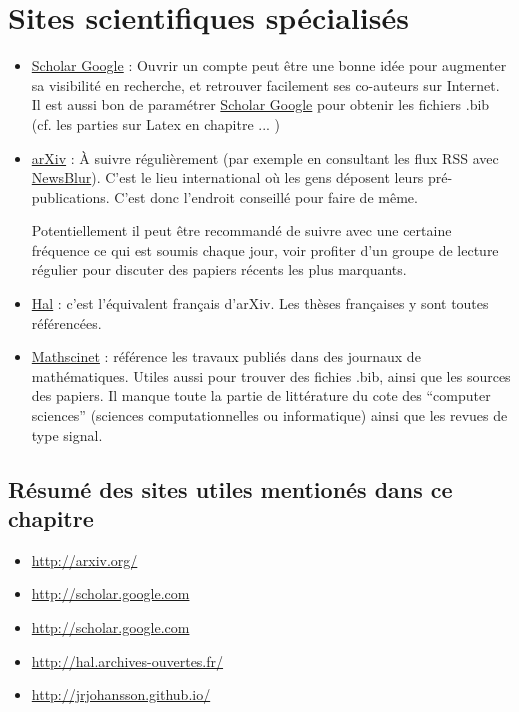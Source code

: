 \section{Sites scientifiques spécialisés}



\begin{itemize}
\item \href{http://scholar.google.com}{Scholar Google} :
Ouvrir un compte peut être une bonne idée pour augmenter sa visibilité en recherche,
et retrouver facilement ses co-auteurs sur Internet.
Il est aussi bon de paramétrer \href{http://scholar.google.com}{Scholar Google} pour
obtenir les fichiers  .bib (cf. les parties sur Latex en chapitre ... )

\item \href{http://arxiv.org/}{arXiv} :
À suivre régulièrement (par exemple en consultant les flux RSS avec 
\href{https://www.newsblur.com/}{NewsBlur}). 
C'est le lieu international
où les gens déposent leurs pré-publications. C'est donc l'endroit conseillé pour faire
de même.

Potentiellement il peut être recommandé de suivre avec une certaine fréquence ce qui est soumis
chaque jour, voir profiter d'un groupe de lecture régulier pour discuter des papiers récents les plus
marquants.

\item \href{http://hal.archives-ouvertes.fr/}{Hal} : c'est l'équivalent français d'arXiv.
Les thèses françaises y sont toutes référencées.


\item \href{http://www.ams.org/mathscinet/}{Mathscinet} : référence les travaux publiés dans
des journaux de mathématiques. Utiles aussi pour trouver des fichies .bib, ainsi que les sources
des papiers. Il manque toute la partie de littérature du cote des ``computer sciences'' (sciences
computationnelles ou informatique) ainsi que les revues de type signal.
\end{itemize}





\subsection*{R\'esum\'e des sites utiles mentionés dans ce chapitre}

\begin{itemize}
\item[\color{orange_js}{$\startri$}]
\url{http://arxiv.org/}
 \item[\color{orange_js}{$\startri$}]
\url{http://scholar.google.com}
 \item[\color{orange_js}{$\startri$}]
\url{http://scholar.google.com} \item[\color{orange_js}{$\stardble$}]
\url{http://hal.archives-ouvertes.fr/}
  \item[\color{orange_js}{$\stardble$}]
\url{http://jrjohansson.github.io/}
\end{itemize}
